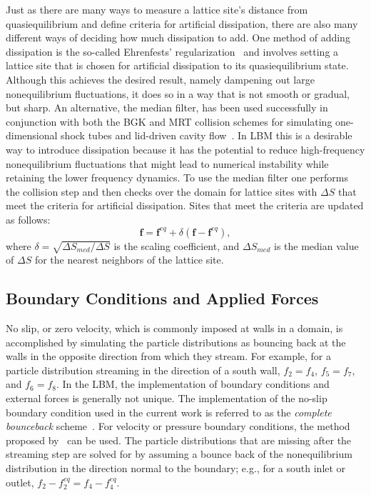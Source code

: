 Just as there are many ways to measure a lattice site's distance from quasiequilibrium and define criteria for artificial dissipation, there are also many different ways of deciding how much dissipation to add.
One method of adding dissipation is the so-called Ehrenfests' regularization~\cite{brownlee2006stabilization} and involves setting a lattice site that is chosen for artificial dissipation to its quasiequilibrium state.
Although this achieves the desired result, namely dampening out large nonequilibrium fluctuations, it does so in a way that is not smooth or gradual, but sharp.
An alternative, the median filter, has been used successfully in conjunction with both the BGK and MRT collision schemes for simulating one-dimensional shock tubes and lid-driven cavity flow~\cite{brownlee2008nonequilibrium,gorban2014enhancement,packwood2009entropy}.
In LBM this is a desirable way to introduce dissipation because it has the potential to reduce high-frequency nonequilibrium fluctuations that might lead to numerical instability while retaining the lower frequency dynamics.
To use the median filter one performs the collision step and then checks over the domain for lattice sites with $\Delta S$ that meet the criteria for artificial dissipation.
Sites that meet the criteria are updated as follows:
\begin{equation} \label{eq:median-filter}
\mathbf{f} = \mathbf{f}^{eq} + \delta (\mathbf{f} - \mathbf{f}^{eq}),
\end{equation}
\noindent where $\delta = \sqrt{\Delta S_{med} / \Delta S}$ is the scaling coefficient, and $\Delta S_{med}$ is the median value of $\Delta S$ for the nearest neighbors of the lattice site.

\subsection{Boundary Conditions and Applied Forces} \label{sec:bcs}

No slip, or zero velocity, which is commonly imposed at walls in a domain, is accomplished by simulating the particle distributions as bouncing back at the walls in the opposite direction from which they stream.
For example, for a particle distribution streaming in the direction of a south wall, $f_2 = f_4$, $f_5 = f_7$, and $f_6 = f_8$.
In the LBM, the implementation of boundary conditions and external forces is generally not unique.
The implementation of the no-slip boundary condition used in the current work is referred to as the \emph{complete bounceback} scheme~\cite{inamuro1995non,he1997analytic}.
For velocity or pressure boundary conditions, the method proposed by~\citet{zou1997pressure} can be used.
The particle distributions that are missing after the streaming step are solved for by assuming a bounce back of the nonequilibrium distribution in the direction normal to the boundary; e.g., for a south inlet or outlet, $f_2 - f_2^{eq} = f_4 - f_4^{eq}$.


